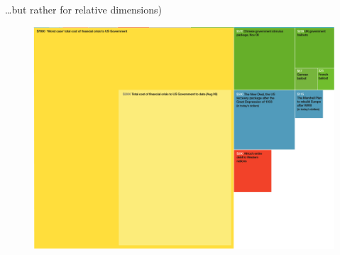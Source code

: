 \documentclass[12pt,english,pdf,dvipsnames,handout]{beamer}
\begin{document}
\begin{frame}{\dots but rather for relative dimensions)}

\begin{figure}
  \centering
  \includegraphics[scale=0.35]{../04-graphs/06_Billion_dollar_gram_2}
\end{figure}

\end{frame}
\end{document}
